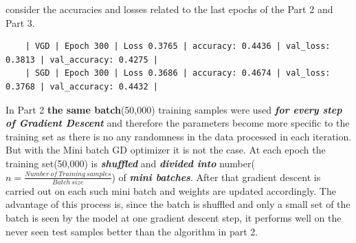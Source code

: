 \documentclass[a4paper,11pt]{article}%
\begin{document}
consider the accuracies and losses related to the last epochs of the Part 2 and Part 3. 
\begin{verbatim}
	| VGD | Epoch 300 | Loss 0.3765 | accuracy: 0.4436 | val_loss: 0.3813 | val_accuracy: 0.4275 |
	| SGD | Epoch 300 | Loss 0.3686 | accuracy: 0.4674 | val_loss: 0.3768 | val_accuracy: 0.4432 |	
\end{verbatim}
In Part 2  \textbf{the same batch}(50,000) training samples were used \textbf{\textit{for every step of Gradient Descent}} and therefore the parameters become more specific to the training set as there is no any randomness in the data processed in each iteration. But with the Mini batch GD optimizer it is not the case. At each epoch the training set(50,000) is \textbf{\textit{shuffled}} and  \textbf{\textit{divided into}} number($n = \frac{Number~ of~ Training~ samples}{Batch~size}$) of \textit{\textbf{mini batches}}. After that gradient descent is carried out on each such mini batch and weights are updated accordingly. The advantage of this process is, since the batch is shuffled and only a small set of the batch is seen by the model at one gradient descent step, it performs well on the never seen test samples better than the algorithm in part 2. 
\end{document}
